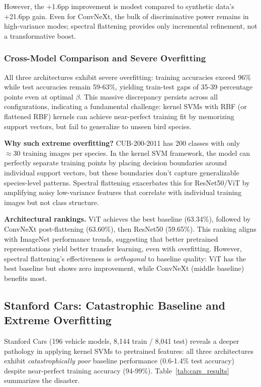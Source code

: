 \documentclass[11pt]{article}
\begin{document}
However, the +1.6pp improvement is modest compared to synthetic data's +21.6pp gain. Even for ConvNeXt, the bulk of discriminative power remains in high-variance modes; spectral flattening provides only incremental refinement, not a transformative boost.

\subsubsection{Cross-Model Comparison and Severe Overfitting}

All three architectures exhibit severe overfitting: training accuracies exceed 96\% while test accuracies remain 59-63\%, yielding train-test gaps of 35-39 percentage points even at optimal $\beta$. This massive discrepancy persists across all configurations, indicating a fundamental challenge: kernel SVMs with RBF (or flattened RBF) kernels can achieve near-perfect training fit by memorizing support vectors, but fail to generalize to unseen bird species.

\textbf{Why such extreme overfitting?} CUB-200-2011 has 200 classes with only $\approx 30$ training images per species. In the kernel SVM framework, the model can perfectly separate training points by placing decision boundaries around individual support vectors, but these boundaries don't capture generalizable species-level patterns. Spectral flattening exacerbates this for ResNet50/ViT by amplifying noisy low-variance features that correlate with individual training images but not class structure.

\textbf{Architectural rankings.} ViT achieves the best baseline (63.34\%), followed by ConvNeXt post-flattening (63.60\%), then ResNet50 (59.65\%). This ranking aligns with ImageNet performance trends, suggesting that better pretrained representations yield better transfer learning, even with overfitting. However, spectral flattening's effectiveness is \emph{orthogonal} to baseline quality: ViT has the best baseline but shows zero improvement, while ConvNeXt (middle baseline) benefits most.

\subsection{Stanford Cars: Catastrophic Baseline and Extreme Overfitting}

Stanford Cars (196 vehicle models, 8,144 train / 8,041 test) reveals a deeper pathology in applying kernel SVMs to pretrained features: all three architectures exhibit \emph{catastrophically poor} baseline performance (0.6-1.4\% test accuracy) despite near-perfect training accuracy (94-99\%). Table~\ref{tab:cars_results} summarizes the disaster.
\end{document}
